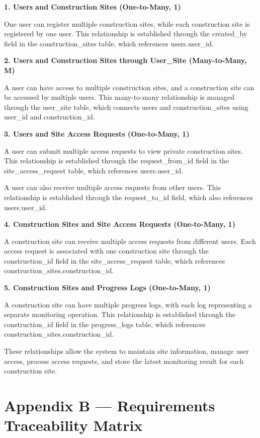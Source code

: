 \documentclass[12pt,a4paper]{report}
\begin{document}
\textbf{1. Users and Construction Sites (One-to-Many, 1)}

One user can register multiple construction sites, while each
construction site is registered by one user. This relationship is
established through the created\_by field in the construction\_sites
table, which references users.user\_id.

\textbf{2. Users and Construction Sites through User\_Site
(Many-to-Many, M)}

A user can have access to multiple construction sites, and a
construction site can be accessed by multiple users. This many-to-many
relationship is managed through the user\_site table, which connects
users and construction\_sites using user\_id and construction\_id.

\textbf{3. Users and Site Access Requests (One-to-Many, 1)}

A user can submit multiple access requests to view private construction
sites. This relationship is established through the request\_from\_id
field in the site\_access\_request table, which references
users.user\_id.

A user can also receive multiple access requests from other users. This
relationship is established through the request\_to\_id field, which
also references users.user\_id.

\textbf{4. Construction Sites and Site Access Requests (One-to-Many, 1)}

A construction site can receive multiple access requests from different
users. Each access request is associated with one construction site
through the construction\_id field in the site\_access\_request table,
which references construction\_sites.construction\_id.

\textbf{5. Construction Sites and Progress Logs (One-to-Many, 1)}

A construction site can have multiple progress logs, with each log
representing a separate monitoring operation. This relationship is
established through the construction\_id field in the progress\_logs
table, which references construction\_sites.construction\_id.

These relationships allow the system to maintain site information,
manage user access, process access requests, and store the latest
monitoring result for each construction site.
\newpage
\chapter{Appendix B --- Requirements Traceability
Matrix}\label{appendix-b-requirements-traceability-matrix}
\end{document}
